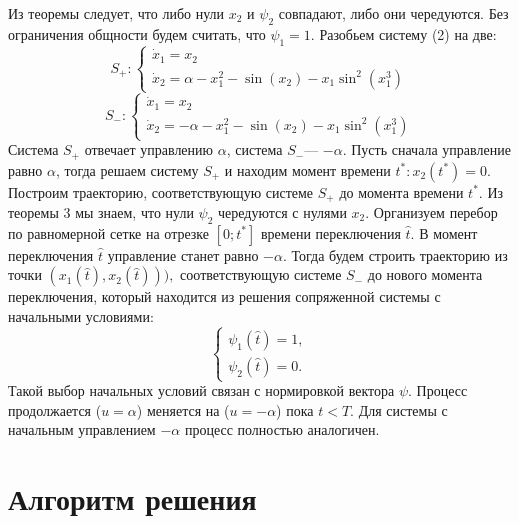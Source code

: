 \documentclass{article}
\theoremstyle{definition}
\begin{document}
 	{Из теоремы следует, что либо нули $x_2$ и $\psi_2$ совпадают, либо они чередуются. Без ограничения общности будем считать, что $\psi_1 = 1$. Разобьем систему (2) на две:}
 	\begin{equation}
 		S_+ : \begin{cases}
 		\dot{x}_1 = x_2\\
 		\dot{x}_2 =  \alpha - x_1^2 - \sin(x_2) - x_1\sin^2(x_1^3)
 		\end{cases}
 	\end{equation}
 	\begin{equation}
 		S_- : \begin{cases}
 		\dot{x}_1 = x_2\\
 		\dot{x}_2 =  -\alpha - x_1^2 - \sin(x_2) - x_1\sin^2(x_1^3)
 		\end{cases}
 	\end{equation}
 	{Система $S_+$ отвечает управлению $\alpha$, система $S_-$--- $-\alpha.$ }
 	\newline
 	{Пусть сначала управление равно $\alpha$, тогда решаем систему $S_+$ и находим момент времени $t^*:x_2(t^*)=0.$ Построим траекторию, соответствующую системе $S_+$ до момента времени $t^*$. Из теоремы 3 мы знаем, что нули $\psi_2$ чередуются с нулями $x_2$. Организуем перебор по равномерной сетке на отрезке $[0; t^*]$ времени переключения $\hat{t}$. В момент переключения $\hat{t}$ управление станет равно $-\alpha.$ Тогда будем строить траекторию из точки $(x_1(\hat{t}),x_2(\hat{t}))),$ соответствующую системе $S_-$ до нового момента переключения, который находится из решения сопряженной системы с начальными условиями:}
 	\begin{equation}
 	\begin{cases}
  	\psi_1(\hat{t}) = 1,\\
 	\psi_2(\hat{t}) = 0.
 	\end{cases}
 	\end{equation}
 	{Такой выбор начальных условий связан с нормировкой вектора $\psi$. Процесс продолжается ($u = \alpha$) меняется на ($u = -\alpha$) пока $t < T.$ Для системы с начальным управлением $-\alpha$ процесс полностью аналогичен.}
 	{\section{Алгоритм решения}}
\end{document}
